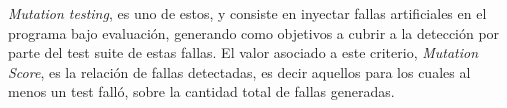 


\emph{Mutation testing}, es uno de estos, y consiste en inyectar fallas artificiales en el programa bajo evaluaci\'on, generando como objetivos a cubrir a la detecci\'on por parte del test suite de estas fallas. El valor asociado a este criterio, \emph{Mutation Score}, es la relaci\'on de fallas detectadas, es decir aquellos para los cuales al menos un test fall\'o, sobre la cantidad total de fallas generadas.


